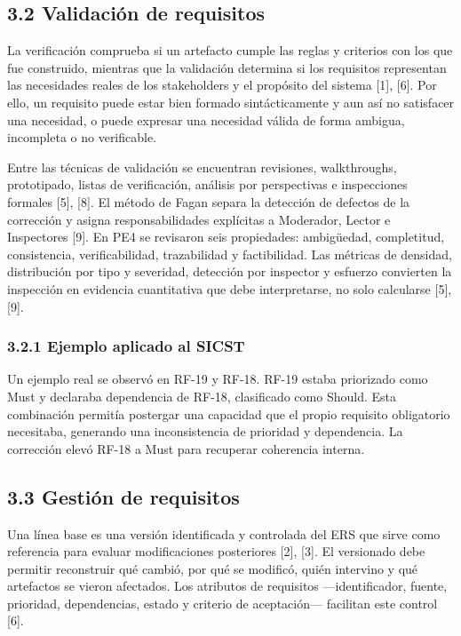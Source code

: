 \documentclass[12pt]{article}
\begin{document}
\subsection{\texorpdfstring{3.2 Validación de requisitos}{3.2 Validación de requisitos}}\label{validaciuxf3n-de-requisitos}

La verificación comprueba si un artefacto cumple las reglas y criterios con los que fue construido, mientras que la validación determina si los requisitos representan las necesidades reales de los stakeholders y el propósito del sistema {[}1{]}, {[}6{]}. Por ello, un requisito puede estar bien formado sintácticamente y aun así no satisfacer una necesidad, o puede expresar una necesidad válida de forma ambigua, incompleta o no verificable.

Entre las técnicas de validación se encuentran revisiones, walkthroughs, prototipado, listas de verificación, análisis por perspectivas e inspecciones formales {[}5{]}, {[}8{]}. El método de Fagan separa la detección de defectos de la corrección y asigna responsabilidades explícitas a Moderador, Lector e Inspectores {[}9{]}. En PE4 se revisaron seis propiedades: ambigüedad, completitud, consistencia, verificabilidad, trazabilidad y factibilidad. Las métricas de densidad, distribución por tipo y severidad, detección por inspector y esfuerzo convierten la inspección en evidencia cuantitativa que debe interpretarse, no solo calcularse {[}5{]}, {[}9{]}.

\subsubsection{\texorpdfstring{3.2.1 Ejemplo aplicado al SICST}{3.2.1 Ejemplo aplicado al SICST}}\label{ejemplo-aplicado-al-sicst}

Un ejemplo real se observó en RF-19 y RF-18. RF-19 estaba priorizado como Must y declaraba dependencia de RF-18, clasificado como Should. Esta combinación permitía postergar una capacidad que el propio requisito obligatorio necesitaba, generando una inconsistencia de prioridad y dependencia. La corrección elevó RF-18 a Must para recuperar coherencia interna.

\subsection{\texorpdfstring{3.3 Gestión de requisitos}{3.3 Gestión de requisitos}}\label{gestiuxf3n-de-requisitos}

Una línea base es una versión identificada y controlada del ERS que sirve como referencia para evaluar modificaciones posteriores {[}2{]}, {[}3{]}. El versionado debe permitir reconstruir qué cambió, por qué se modificó, quién intervino y qué artefactos se vieron afectados. Los atributos de requisitos ---identificador, fuente, prioridad, dependencias, estado y criterio de aceptación--- facilitan este control {[}6{]}.
\end{document}
